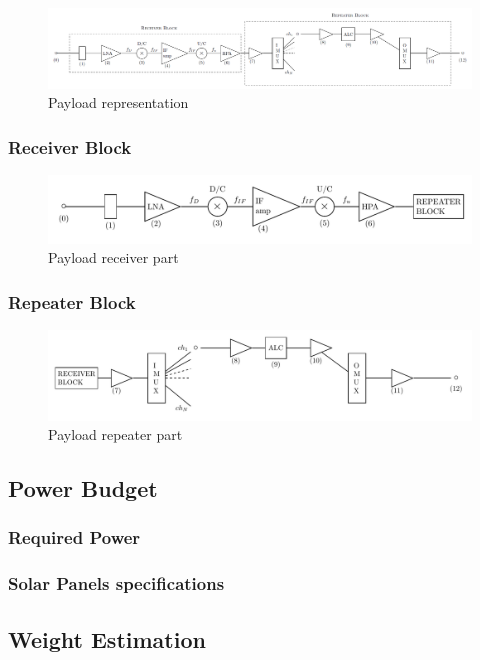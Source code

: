 \documentclass[11pt,a4paper,titlepage]{article}
\begin{document}
		\begin{figure}
		\centering
		\includegraphics[width = \textwidth]{Payload.png}
		\caption{Payload representation}
		\label{fig:payload}
		\end{figure}

		\subsubsection{Receiver Block}
			\begin{figure}
			\centering
			\includegraphics[width = .8\textwidth]{payload_receiver.pdf}
			\caption{Payload receiver part}
			\label{fig:receiver}
			\end{figure}
		\subsubsection{Repeater Block}
			\begin{figure}
			\centering
			\includegraphics[width = .8\textwidth]{payload_repeater.pdf}
			\caption{Payload repeater part}
			\label{fig:repeater}
			\end{figure}
	\subsection{Power Budget}
		\subsubsection{Required Power}
			\lipsum[1]
		\subsubsection{Solar Panels specifications}
			\lipsum[1]
	\subsection{Weight Estimation}
		\lipsum[1]
\end{document}
